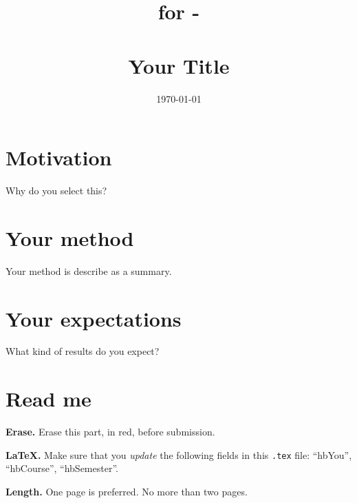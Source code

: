 \documentclass[11pt,a4,twocolumn]{article}
\title{
	{\small 	
		for \hbCourse-\hbSemester\\
	}
	\hbWhat\\
	Your Title
}
\author{\hbYou}
\date{\today}
\newcommand{\hCode}[1]{\texttt{#1}}
\begin{document}
\maketitle




\section{Motivation} 

Why do you select this?




\section{Your method} 

Your method is describe as a summary.




\section{Your expectations} 

What kind of results do you expect?




{\color{red} %
	\section*{Read me} 
	
	\textbf{Erase.} 
	Erase this part, in red, before submission.
	
	\textbf{\LaTeX.}
	Make sure that you \emph{update} the following fields in this \hCode{.tex} file:
	``hbYou'',
	``hbCourse'',
	``hbSemester''.
	
	\textbf{Length.} 
	One page is preferred. 
	No more than two pages.
} %











\end{document}
